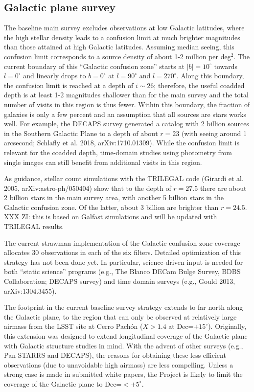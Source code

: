 \documentclass[DM,lsstdraft,toc,usenatbib]{lsstdoc}
\begin{document}
\subsection{Galactic plane survey \label{sec:GP}}

The baseline main survey excludes observations at low Galactic latitudes, where the high 
stellar density leads to a confusion limit at much brighter magnitudes than those attained 
at high Galactic latitudes. Assuming median seeing, this confusion limit corresponds to a
source density of about 1-2 million per deg$^2$. The current boundary of this ``Galactic
confusion zone'' starts at $|b|=10^\circ$ towards $l=0^\circ$ and linearly drops to $b=0^\circ$
at $l=90^\circ$ and $l=270^\circ$. Along this boundary, the confusion limit is reached at a
depth of $i \sim 26$; therefore, the useful coadded depth is at least 1-2 magnitudes 
shallower than for the main survey and the total number of visits in this region is thus fewer. 
Within this boundary, the fraction of galaxies is only
a few percent and an assumption that all sources are stars works well. For example, the
DECAPS survey generated a catalog with 2 billion sources in the Southern Galactic Plane
to a depth of about $r=23$ (with seeing around 1 arcsecond; Schlafly et al. 2018, 
arXiv:1710.01309). While the confusion limit is relevant for the coadded depth, time-domain
studies using photometry from single images can still benefit from additional visits in this region.

As guidance, stellar count simulations with the TRILEGAL code (Girardi et al. 2005, 
arXiv:astro-ph/050404) show that to the depth of $r=27.5$ there are about 2 billion
stars in the main survey area, with another 5 billion stars in the Galactic confusion 
zone. Of the latter, about 3 billion are brighter than $r=24.5$.   XXX ZI: this is based
on Galfast simulations and will be updated with TRILEGAL results. 

The current strawman implementation of the Galactic confusion zone coverage allocates 
30 observations in each of the six filters. Detailed optimization of this strategy has not 
been done yet. In particular, science-driven input is needed for both ``static science''
programs (e.g., The Blanco DECam Bulge Survey, BDBS Collaboration; DECAPS survey) 
and  time domain surveys (e.g., Gould 2013, arXiv:1304.3455). 

The footprint in the current baseline survey strategy extends to far north along the Galactic
plane, to the region that can only be observed at relatively large airmass from the LSST
site at Cerro Pach\'on ($X>1.4$ at Dec=$+15^\circ$). Originally, this extension was designed 
to extend longitudinal coverage of the Galactic plane with Galactic structure studies in mind. 
With the advent of other surveys (e.g., Pan-STARRS and DECAPS), the reasons for obtaining 
these less efficient observations (due to unavoidable high airmass) are less compelling. 
Unless a strong case is made in submitted white papers, the Project is likely to limit the 
coverage of the Galactic plane to Dec=$<+5^\circ$. 
\end{document}
